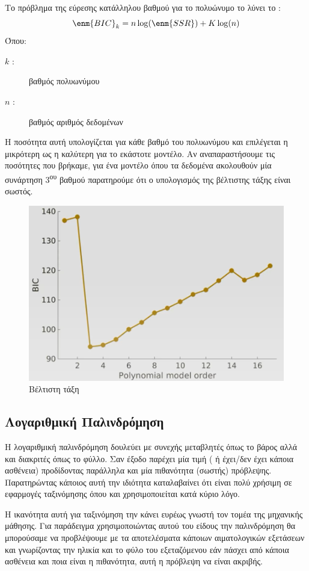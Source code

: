Το πρόβλημα της εύρεσης κατάλληλου βαθμού για το πολυώνυμο το λύνει το :
$$\enm{BIC}_k=n\log (\enm{SSR})+K\log (n)$$
Όπου:
\begin{description}
    \item[$k$ :] βαθμός πολυωνύμου
    \item[$n$ :] βαθμός αριθμός δεδομένων
\end{description}
Η ποσότητα αυτή υπολογίζεται για κάθε βαθμό του πολυωνύμου και επιλέγεται η μικρότερη
ως η καλύτερη για το εκάστοτε μοντέλο. Αν αναπαραστήσουμε τις ποσότητες που
βρήκαμε, για ένα μοντέλο όπου τα δεδομένα ακολουθούν μία συνάρτηση 3\textsuperscript{ου} βαθμού
παρατηρούμε ότι ο υπολογισμός της βέλτιστης τάξης είναι σωστός.

\begin{figure}[H]
    \centering
    \includegraphics[width=1\textwidth]{images/BIC_2.png}
    \caption{Βέλτιστη τάξη}
\end{figure}
\subsection{Λογαριθμική Παλινδρόμηση}
Η λογαριθμική παλινδρόμηση δουλεύει με συνεχής μεταβλητές  όπως το βάρος αλλά και διακριτές
όπως το φύλλο. Σαν έξοδο παρέχει μία
 τιμή ( ή έχει/δεν έχει κάποια ασθένεια) προδίδοντας παράλληλα και μία
πιθανότητα (σωστής) πρόβλεψης. Παρατηρώντας κάποιος αυτή την ιδιότητα καταλαβαίνει
ότι είναι πολύ χρήσιμη σε εφαρμογές ταξινόμησης όπου και χρησιμοποιείται κατά κύριο
λόγο.

Η ικανότητα αυτή για ταξινόμηση την κάνει ευρέως γνωστή τον τομέα της μηχανικής
μάθησης. Για παράδειγμα χρησιμοποιώντας αυτού του είδους την παλινδρόμηση θα
μπορούσαμε να προβλέψουμε με τα αποτελέσματα κάποιων αιματολογικών εξετάσεων και
γνωρίζοντας την ηλικία και το φύλο του εξεταζόμενου εάν πάσχει από κάποια ασθένεια και
ποια είναι η πιθανότητα, αυτή η πρόβλεψη να είναι ακριβής.

